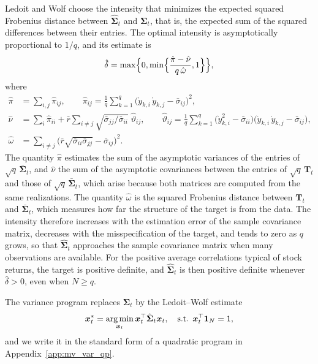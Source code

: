 Ledoit and Wolf choose the intensity that minimizes the expected squared Frobenius distance between
$\hat{\bm{\Sigma}}_t$ and $\bm{\Sigma}_t$, that is, the expected sum of the squared differences between their entries.
The optimal intensity is asymptotically proportional to $1/q$, and its estimate is
\begin{equation*}
    \hat{\delta} = \max\Bigl\{ 0, \min\Bigl\{ \frac{\hat{\pi} - \hat{\nu}}{q\, \hat{\omega}}, 1 \Bigr\} \Bigr\},
\end{equation*}
where
\begin{align*}
    \hat{\pi} &= \sum_{i,j} \hat{\pi}_{ij},
    \qquad \hat{\pi}_{ij} = \frac{1}{q} \sum_{k=1}^q \bigl( \mathring{y}_{k,i}\, \mathring{y}_{k,j} - \bar{\sigma}_{ij} \bigr)^2, \\
    \hat{\nu} &= \sum_{i} \hat{\pi}_{ii} + \bar{r} \sum_{i \neq j} \sqrt{\bar{\sigma}_{jj} / \bar{\sigma}_{ii}}\;
    \hat{\vartheta}_{ij}, 
    \qquad \hat{\vartheta}_{ij} = \frac{1}{q} \sum_{k=1}^q \bigl( \mathring{y}_{k,i}^2 - \bar{\sigma}_{ii} \bigr)
    \bigl( \mathring{y}_{k,i}\, \mathring{y}_{k,j} - \bar{\sigma}_{ij} \bigr), \\
    \hat{\omega} &= \sum_{i \neq j} \bigl( \bar{r} \sqrt{\bar{\sigma}_{ii} \bar{\sigma}_{jj}} - \bar{\sigma}_{ij} \bigr)^2.
\end{align*}
The quantity $\hat{\pi}$ estimates the sum of the asymptotic variances of the entries of $\sqrt{q}\,\bar{\bm{\Sigma}}_t$,
and $\hat{\nu}$ the sum of the asymptotic covariances between the entries of $\sqrt{q}\,\bm{T}_t$ and those of
$\sqrt{q}\,\bar{\bm{\Sigma}}_t$, which arise because both matrices are computed from the same realizations. The quantity
$\hat{\omega}$ is the squared Frobenius distance between $\bm{T}_t$ and $\bar{\bm{\Sigma}}_t$, which measures how far the
structure of the target is from the data. The intensity therefore increases with the estimation error of the sample
covariance matrix, decreases with the misspecification of the target, and tends to zero as $q$ grows, so that
$\hat{\bm{\Sigma}}_t$ approaches the sample covariance matrix when many observations are available. For the positive
average correlations typical of stock returns, the target is positive definite, and $\hat{\bm{\Sigma}}_t$ is then
positive definite whenever $\hat{\delta} > 0$, even when $N \ge q$.

The variance program replaces $\bm{\Sigma}_t$ by the Ledoit--Wolf estimate
\begin{equation*}
    \bm{x}_t^* = \operatorname*{arg\,min}_{\bm{x}_t} \bm{x}_t^\top \hat{\bm{\Sigma}}_t \bm{x}_t, \quad \text{s.t. } \bm{x}_t^\top \bm{1}_N = 1,
\end{equation*}
and we write it in the standard form of a quadratic program in Appendix~\ref{app:mv_var_qp}.

